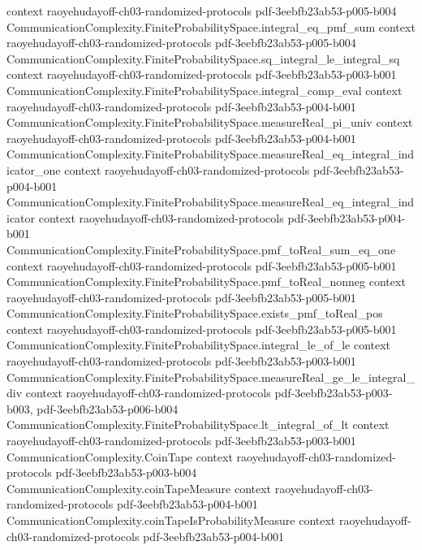 \begin{theorem}
  {context}
  {raoyehudayoff-ch03-randomized-protocols}
  {pdf-3eebfb23ab53-p005-b004}
\proofstep
  {CommunicationComplexity.FiniteProbabilitySpace.integral_eq_pmf_sum}
  {context}
  {raoyehudayoff-ch03-randomized-protocols}
  {pdf-3eebfb23ab53-p005-b004}
\proofstep
  {CommunicationComplexity.FiniteProbabilitySpace.sq_integral_le_integral_sq}
  {context}
  {raoyehudayoff-ch03-randomized-protocols}
  {pdf-3eebfb23ab53-p003-b001}
\proofstep
  {CommunicationComplexity.FiniteProbabilitySpace.integral_comp_eval}
  {context}
  {raoyehudayoff-ch03-randomized-protocols}
  {pdf-3eebfb23ab53-p004-b001}
\proofstep
  {CommunicationComplexity.FiniteProbabilitySpace.measureReal_pi_univ}
  {context}
  {raoyehudayoff-ch03-randomized-protocols}
  {pdf-3eebfb23ab53-p004-b001}
\proofstep
  {CommunicationComplexity.FiniteProbabilitySpace.measureReal_eq_integral_indicator_one}
  {context}
  {raoyehudayoff-ch03-randomized-protocols}
  {pdf-3eebfb23ab53-p004-b001}
\proofstep
  {CommunicationComplexity.FiniteProbabilitySpace.measureReal_eq_integral_indicator}
  {context}
  {raoyehudayoff-ch03-randomized-protocols}
  {pdf-3eebfb23ab53-p004-b001}
\proofstep
  {CommunicationComplexity.FiniteProbabilitySpace.pmf_toReal_sum_eq_one}
  {context}
  {raoyehudayoff-ch03-randomized-protocols}
  {pdf-3eebfb23ab53-p005-b001}
\proofstep
  {CommunicationComplexity.FiniteProbabilitySpace.pmf_toReal_nonneg}
  {context}
  {raoyehudayoff-ch03-randomized-protocols}
  {pdf-3eebfb23ab53-p005-b001}
\proofstep
  {CommunicationComplexity.FiniteProbabilitySpace.exists_pmf_toReal_pos}
  {context}
  {raoyehudayoff-ch03-randomized-protocols}
  {pdf-3eebfb23ab53-p005-b001}
\proofstep
  {CommunicationComplexity.FiniteProbabilitySpace.integral_le_of_le}
  {context}
  {raoyehudayoff-ch03-randomized-protocols}
  {pdf-3eebfb23ab53-p003-b001}
\proofstep
  {CommunicationComplexity.FiniteProbabilitySpace.measureReal_ge_le_integral_div}
  {context}
  {raoyehudayoff-ch03-randomized-protocols}
  {pdf-3eebfb23ab53-p003-b003,
    pdf-3eebfb23ab53-p006-b004}
\proofstep
  {CommunicationComplexity.FiniteProbabilitySpace.lt_integral_of_lt}
  {context}
  {raoyehudayoff-ch03-randomized-protocols}
  {pdf-3eebfb23ab53-p003-b001}
\proofstep
  {CommunicationComplexity.CoinTape}
  {context}
  {raoyehudayoff-ch03-randomized-protocols}
  {pdf-3eebfb23ab53-p003-b004}
\proofstep
  {CommunicationComplexity.coinTapeMeasure}
  {context}
  {raoyehudayoff-ch03-randomized-protocols}
  {pdf-3eebfb23ab53-p004-b001}
\proofstep
  {CommunicationComplexity.coinTapeIsProbabilityMeasure}
  {context}
  {raoyehudayoff-ch03-randomized-protocols}
  {pdf-3eebfb23ab53-p004-b001}

\end{theorem}
